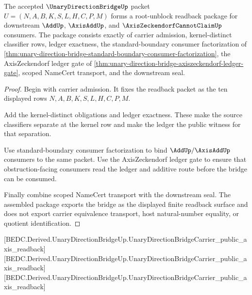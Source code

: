 \begin{theorem}
\label{thm:unary-direction-bridge-root-unblock-readback-package}
The accepted $\UnaryDirectionBridgeUp$ packet $U=(N,A,B,K,S,L,H,C,P,M)$ forms a root-unblock readback package for downstream $\AddUp$, $\AxisAddUp$, and $\AxisZeckendorfCannotClaimUp$ consumers. The package consists exactly of carrier admission, kernel-distinct classifier rows, ledger exactness, the standard-boundary consumer factorization of \autoref{thm:unary-direction-bridge-standard-boundary-consumer-factorization}, the AxisZeckendorf ledger gate of \autoref{thm:unary-direction-bridge-axiszeckendorf-ledger-gate}, scoped NameCert transport, and the downstream seal.
\end{theorem}
\begin{proof}
Begin with carrier admission. It fixes the readback packet as the ten displayed rows $N,A,B,K,S,L,H,C,P,M$.

Add the kernel-distinct obligations and ledger exactness. These make the source classifiers separate at the kernel row and make the ledger the public witness for that separation.

Use standard-boundary consumer factorization to bind $\AddUp/\AxisAddUp$ consumers to the same packet. Use the AxisZeckendorf ledger gate to ensure that obstruction-facing consumers read the ledger and additive route before the bridge can be consumed.

Finally combine scoped NameCert transport with the downstream seal. The assembled package exports the bridge as the displayed finite readback surface and does not export carrier equivalence transport, host natural-number equality, or quotient identification.
\end{proof}

[BEDC.Derived.UnaryDirectionBridgeUp.UnaryDirectionBridgeCarrier\_public\_axis\_readback]
[BEDC.Derived.UnaryDirectionBridgeUp.UnaryDirectionBridgeCarrier\_public\_axis\_readback]
[BEDC.Derived.UnaryDirectionBridgeUp.UnaryDirectionBridgeCarrier\_public\_axis\_readback]

